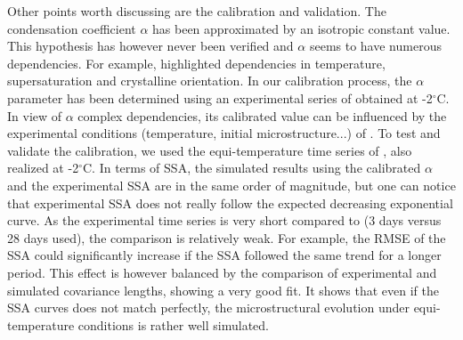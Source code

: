 \documentclass[draft,ms]{agujournal2019}
\begin{document}

Other points worth discussing are the calibration and validation. The condensation coefficient $\alpha$ has been approximated by an isotropic constant value. This hypothesis has however never been verified and $\alpha$ seems to have numerous dependencies. For example,  highlighted dependencies in temperature, supersaturation and crystalline orientation.
In our calibration process, the $\alpha$ parameter has been determined using an experimental series of  obtained at -2$^\circ$C. In view of $\alpha$ complex dependencies, its calibrated value can be influenced by the experimental conditions (temperature, initial microstructure...) of . To test and validate the calibration, we used the equi-temperature time series of , also realized at -2$^\circ$C. In terms of SSA, the simulated results using the calibrated $\alpha$ and the experimental SSA are in the same order of magnitude, but one can notice that  experimental SSA does not really follow the expected decreasing exponential curve. As the experimental time series is very short compared to  (3 days versus 28 days used), the comparison is relatively weak. For example, the RMSE of the SSA could significantly increase if the SSA followed the same trend for a longer period. %
This effect is however balanced by the comparison of experimental and simulated covariance lengths, showing a very good fit. It shows that even if the SSA curves does not match perfectly, the microstructural evolution under equi-temperature conditions is rather well simulated.
\end{document}
